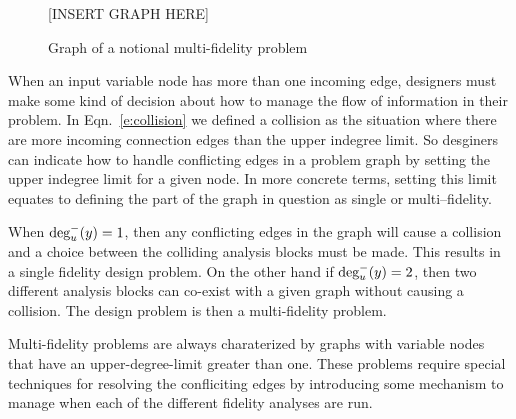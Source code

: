   \begin{figure}
    \begin{center}
    [INSERT GRAPH HERE]
    \caption{Graph of a notional multi-fidelity problem \label{f:collision_example}}
  \end{center}
  \end{figure}

  When an input variable node has more than one incoming edge, designers must make
  some kind of decision about how to manage the flow of information in their problem. 
  In Eqn.~\ref{e:collision} we defined a collision as the situation where
  there are more incoming connection edges than the upper indegree limit. So desginers can
  indicate how to handle conflicting edges in a problem graph by setting the upper indegree limit
  for a given node. In more concrete terms, setting this limit equates to defining 
  the part of the graph in question as single or multi--fidelity. 

  When $\textrm{deg}_u^-(y)=1$, then any conflicting edges in the graph will cause a collision
  and a choice between the colliding analysis blocks must be made. This results in a 
  single fidelity design problem. On the other hand if $\textrm{deg}_u^-(y)=2$, then two 
  different analysis blocks can co-exist with a given graph without causing a 
  collision. The design problem is then a multi-fidelity problem.

  Multi-fidelity problems are always charaterized by graphs with variable 
  nodes that have an upper-degree-limit greater than one. These problems require 
  special techniques for resolving the confliciting edges by introducing some mechanism
  to manage when each of the different fidelity analyses are 
  run\cite{march2012provably,alexandrov2001approximation,Huang_Allen_Notz_Miller_2006}.



